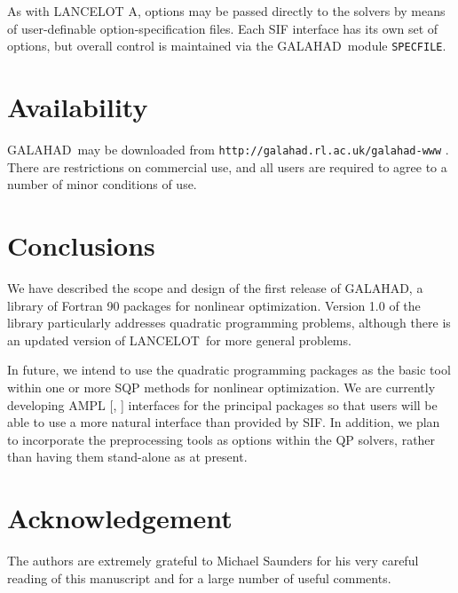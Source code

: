 \documentclass[acmtocl,acmnow]{acmtrans2m}
\newcommand{\gal}{{\sf GALAHAD}}
\newcommand{\lan}{{\sf LANCELOT}}
\newcommand{\lana}{{\sf LANCELOT A}}
\newcommand{\resetcounters}{\setcounter{equation}{0} \setcounter{figure}{0} 
 \setcounter{table}{0}}
\newcommand{\lsection}[1]{\section{#1} \resetcounters \label{#1}}
\newcommand{\bciteb}[1]{\citeauthor{#1}, \citeyear{#1}}
\begin{document}
As with \lana, options may be passed directly to the solvers by means of
user-definable option-specification files. Each SIF interface 
has its own set of options, but overall control is maintained via 
the \gal\ module {\tt SPECFILE}.

\lsection{Availability}

\gal\ may be downloaded from
{\tt http://galahad.rl.ac.uk/galahad-www} .
There are restrictions on commercial use, and all users are required to
agree to a number of minor conditions of use.

\lsection{Conclusions}

We have described the scope and design of the first release of \gal,
a library of Fortran 90 packages for nonlinear optimization.
Version 1.0 of the library particularly addresses quadratic programming 
problems, although there is an updated version of \lan\ for more general 
problems. 

In future, we intend to use the quadratic programming packages as the
basic tool within one or more SQP methods for nonlinear optimization.
We are currently developing AMPL [\bciteb{FourGayKern93}] interfaces 
for the principal packages so that users will be able to use a more
natural interface than provided by SIF. In addition, we plan to incorporate
the preprocessing tools as options within the QP solvers, rather than having
them stand-alone as at present.

\section*{Acknowledgement}

The authors are extremely grateful to Michael Saunders for his very
careful reading of this manuscript and for a large number of useful comments.

\end{document}
